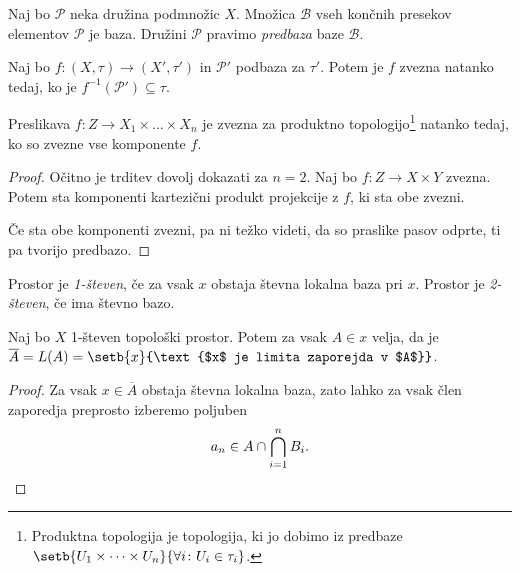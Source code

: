 \obvs

\begin{definicija}
Naj bo $\mathcal{P}$ neka družina podmnožic $X$. Množica
$\mathcal{B}$ vseh končnih presekov elementov $\mathcal{P}$ je
baza. Družini $\mathcal{P}$ pravimo
\emph{predbaza} baze $\mathcal{B}$.
\end{definicija}

\begin{trditev}
Naj bo $f \colon (X,\tau) \to (X',\tau')$ in $\mathcal{P}'$ podbaza
za $\tau'$. Potem je $f$ zvezna natanko tedaj, ko je
$f^{-1}(\mathcal{P}') \subseteq \tau$.
\end{trditev}

\obvs

\begin{trditev}
Preslikava $f \colon Z \to X_1 \times \dots \times X_n$ je zvezna
za produktno topologijo\footnote{Produktna topologija je
topologija, ki jo dobimo iz predbaze
$\setb{U_1 \times \dots \times U_n}
{\forall i \colon U_i \in \tau_i}$.}
natanko tedaj, ko so zvezne vse komponente
$f$.
\end{trditev}

\begin{proof}
Očitno je trditev dovolj dokazati za $n=2$. Naj bo
$f \colon Z \to X \times Y$ zvezna. Potem sta komponenti kartezični
produkt projekcije z $f$, ki sta obe zvezni.

Če sta obe komponenti zvezni, pa ni težko videti, da so praslike
pasov odprte, ti pa tvorijo predbazo.
\end{proof}

\begin{definicija}
Prostor je \emph{1-števen}, če
za vsak $x$ obstaja števna lokalna baza pri $x$. Prostor je
\emph{2-števen}, če ima števno bazo.
\end{definicija}

\begin{trditev}
Naj bo $X$ 1-števen topološki prostor. Potem za vsak $A \in x$
velja, da je $\overline{A} = L(A) =
\setb{x}{\text{$x$ je limita zaporejda v $A$}}$.
\end{trditev}

\begin{proof}
Za vsak $x \in \overline{A}$ obstaja števna lokalna baza, zato
lahko za vsak člen zaporedja preprosto izberemo poljuben
\[
a_n \in A \cap \bigcap_{i=1}^n B_i. \qedhere
\]
\end{proof}

